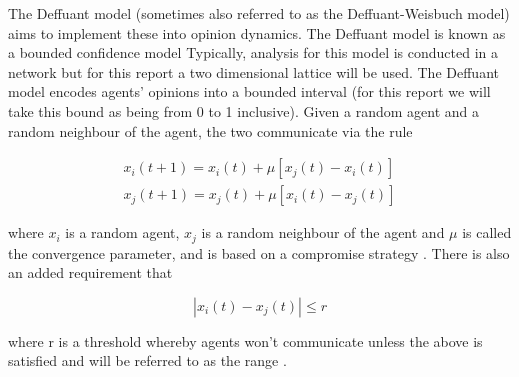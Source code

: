 The Deffuant model (sometimes also referred to as the Deffuant-Weisbuch model) \cite{doi:10.1142/S0219525900000078} aims to implement these into opinion dynamics. The Deffuant model is known as a bounded confidence model \cite{castellano2009statistical} Typically, analysis for this model is conducted in a network but for this report a two dimensional lattice will be used. The Deffuant model encodes agents' opinions into a bounded interval (for this report we will take this bound as being from 0 to 1 inclusive). Given a random agent and a random neighbour of the agent, the two communicate via the rule

\begin{eqnarray}\label{UpdateRule}
x_{i}(t+1) = x_{i}(t) + \mu [x_{j}(t)-x_{i}(t)] \label{UpRuleA} \\
x_{j}(t+1) = x_{j}(t) + \mu [x_{i}(t)-x_{j}(t)] \label{UpRuleB}
\end{eqnarray}

where $x_{i}$ is a random agent, $x_{j}$ is a random neighbour of the agent and $\mu$ is called the convergence parameter, and is based on a compromise strategy \cite{castellano2009statistical}. There is also an added requirement that

\begin{equation}\label{CommRequirement}
|x_{i}(t) - x_{j}(t)| \leq r
\end{equation}

where r is a threshold whereby agents won't communicate unless the above is satisfied and will be referred to as the range  \cite{doi:10.1142/S0219525900000078}.